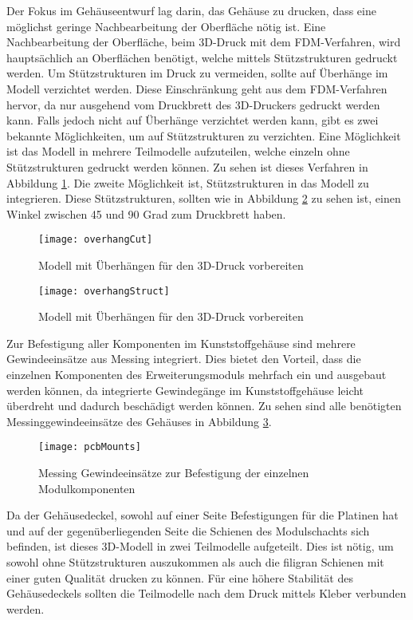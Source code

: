 Der Fokus im Gehäuseentwurf lag darin, das Gehäuse zu drucken, dass eine möglichst geringe Nachbearbeitung der Oberfläche nötig ist. Eine Nachbearbeitung der Oberfläche, beim 3D-Druck mit dem \ac{FDM}-Verfahren, wird hauptsächlich an Oberflächen benötigt, welche mittels Stützstrukturen gedruckt werden. Um Stützstrukturen im Druck zu vermeiden, sollte auf Überhänge im Modell verzichtet werden. Diese Einschränkung geht aus dem \ac{FDM}-Verfahren hervor, da nur ausgehend vom Druckbrett des 3D-Druckers gedruckt werden kann. Falls jedoch nicht auf Überhänge verzichtet werden kann, gibt es zwei bekannte Möglichkeiten, um auf Stützstrukturen zu verzichten. Eine Möglichkeit ist das Modell in mehrere Teilmodelle aufzuteilen, welche einzeln ohne Stützstrukturen gedruckt werden können. Zu sehen ist dieses Verfahren in Abbildung \ref{fig:overhangCut}. Die zweite Möglichkeit ist, Stützstrukturen in das Modell zu integrieren. Diese Stützstrukturen, sollten wie in Abbildung \ref{fig:overhangStruct} zu sehen ist, einen Winkel zwischen 45 und 90 Grad zum Druckbrett haben.

\begin{figure}[h]
    \centering
    \texttt{[image: overhangCut]}
    \caption{Modell mit Überhängen für den 3D-Druck vorbereiten}
    \label{fig:overhangCut}
\end{figure}

\begin{figure}[h]
    \centering
    \texttt{[image: overhangStruct]}
    \caption{Modell mit Überhängen für den 3D-Druck vorbereiten}
    \label{fig:overhangStruct}
\end{figure}

Zur Befestigung aller Komponenten im Kunststoffgehäuse sind mehrere Gewindeeinsätze aus Messing integriert. Dies bietet den Vorteil, dass die einzelnen Komponenten des Erweiterungsmoduls mehrfach ein und ausgebaut werden können, da integrierte Gewindegänge im Kunststoffgehäuse leicht überdreht und dadurch beschädigt werden können. Zu sehen sind alle benötigten Messinggewindeeinsätze des Gehäuses in Abbildung \ref{fig:pcbMounts}.

\begin{figure}[h]
    \centering
    \texttt{[image: pcbMounts]}
    \caption{Messing Gewindeeinsätze zur Befestigung der einzelnen Modulkomponenten}
    \label{fig:pcbMounts}
\end{figure}

Da der Gehäusedeckel, sowohl auf einer Seite Befestigungen für die Platinen hat und auf der gegenüberliegenden Seite die Schienen des Modulschachts sich befinden, ist dieses 3D-Modell in zwei Teilmodelle aufgeteilt. Dies ist nötig, um sowohl ohne Stützstrukturen auszukommen als auch die filigran Schienen mit einer guten Qualität drucken zu können. Für eine höhere Stabilität des Gehäusedeckels sollten die Teilmodelle nach dem Druck mittels Kleber verbunden werden.

